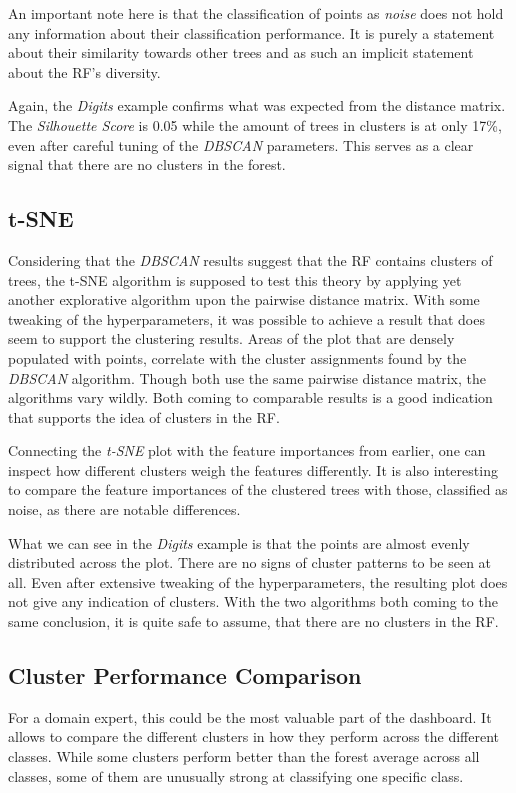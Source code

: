 \documentclass[a4paper, 12pt]{article}
\begin{document}
An important note here is that the classification of points as \textit{noise} does not hold any information about
their classification performance. It is purely a statement about their similarity towards other trees and as such
an implicit statement about the RF's diversity. \par

Again, the \textit{Digits} example confirms what was expected from the distance matrix. The \textit{Silhouette
    Score} is 0.05 while the amount of trees in clusters is at only 17\%, even after careful tuning of the
\textit{DBSCAN} parameters. This serves as a clear signal that there are no clusters in the forest.

\subsection{t-SNE}
Considering that the \textit{DBSCAN} results suggest that the RF contains clusters of trees, the t-SNE algorithm
is supposed to test this theory by applying yet another explorative algorithm upon the pairwise distance matrix.
With some tweaking of the hyperparameters, it was possible to achieve a result that does seem to support the
clustering results. Areas of the plot that are densely populated with points, correlate with the cluster
assignments found by the \textit{DBSCAN} algorithm. Though both use the same pairwise distance matrix, the
algorithms vary wildly. Both coming to comparable results is a good indication that supports the idea of clusters
in the RF. \par
Connecting the \textit{t-SNE} plot with the feature importances from earlier, one can inspect how different
clusters weigh the features differently. It is also interesting to compare the feature importances of the
clustered trees with those, classified as noise, as there are notable differences. \par

What we can see in the \textit{Digits} example is that the points are almost evenly distributed across the plot.
There are no signs of cluster patterns to be seen at all. Even after extensive tweaking of the hyperparameters,
the resulting plot does not give any indication of clusters. With the two algorithms both coming to the same
conclusion, it is quite safe to assume, that there are no clusters in the RF.

\subsection{Cluster Performance Comparison}
For a domain expert, this could be the most valuable part of the dashboard. It allows to compare the different
clusters in how they perform across the different classes. While some clusters perform better than the forest
average across all classes, some of them are unusually strong at classifying one specific class. \par
\end{document}
